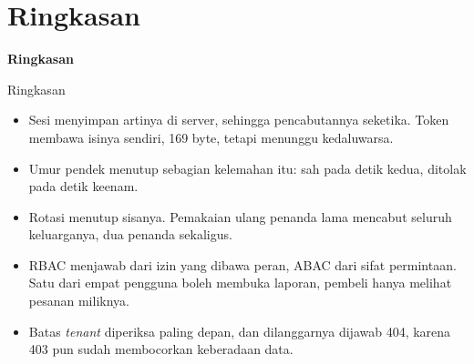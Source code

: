 \documentclass[aspectratio=169, table, 12pt]{beamer}
\begin{document}
\section{Ringkasan}

\begin{frame}{\hfill}
  \centering
  \Huge{\textbf{Ringkasan}}
\end{frame}

\begin{frame}{{\Large Ringkasan}}
  \vspace{8pt}
  \begin{itemize}
    \item Sesi menyimpan artinya di server, sehingga pencabutannya seketika.
          Token membawa isinya sendiri, 169 byte, tetapi menunggu
          kedaluwarsa.
    \item Umur pendek menutup sebagian kelemahan itu: sah pada detik kedua,
          ditolak pada detik keenam.
    \item Rotasi menutup sisanya. Pemakaian ulang penanda lama mencabut
          seluruh keluarganya, dua penanda sekaligus.
    \item RBAC menjawab dari izin yang dibawa peran, ABAC dari sifat
          permintaan. Satu dari empat pengguna boleh membuka laporan,
          pembeli hanya melihat pesanan miliknya.
    \item Batas \textit{tenant} diperiksa paling depan, dan dilanggarnya
          dijawab 404, karena 403 pun sudah membocorkan keberadaan data.
  \end{itemize}
\end{frame}
\end{document}
